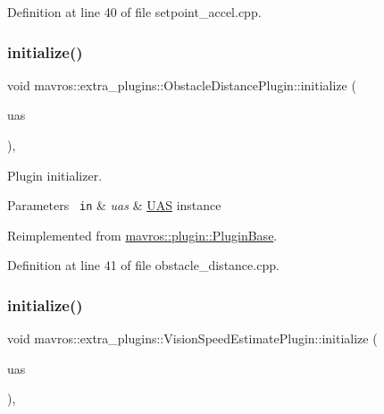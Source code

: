 Definition at line 40 of file setpoint\+\_\+accel.\+cpp.

\mbox{\label{group__plugin_gaf7844065d4ccf3cea88c251437553991}} 
\subsubsection{\texorpdfstring{initialize()}{initialize()}\hspace{0.1cm}{\footnotesize\ttfamily [19/41]}}
{\footnotesize\ttfamily void mavros\+::extra\+\_\+plugins\+::\+Obstacle\+Distance\+Plugin\+::initialize (\begin{DoxyParamCaption}\item[{\mbox{\hyperlink{classmavros_1_1UAS}{U\+AS}} \&}]{uas }\end{DoxyParamCaption})\hspace{0.3cm}{\ttfamily [inline]}, {\ttfamily [virtual]}}



Plugin initializer. 


\begin{DoxyParams}[1]{Parameters}
\mbox{\texttt{ in}}  & {\em uas} & {\ttfamily \mbox{\hyperlink{classmavros_1_1UAS}{U\+AS}}} instance \\
\hline
\end{DoxyParams}


Reimplemented from \mbox{\hyperlink{group__plugin_gad5313a41da4d26acbbabf008cdc21e82}{mavros\+::plugin\+::\+Plugin\+Base}}.



Definition at line 41 of file obstacle\+\_\+distance.\+cpp.

\mbox{\label{group__plugin_ga81a7aa98620a46b76f89020201d47198}} 
\subsubsection{\texorpdfstring{initialize()}{initialize()}\hspace{0.1cm}{\footnotesize\ttfamily [20/41]}}
{\footnotesize\ttfamily void mavros\+::extra\+\_\+plugins\+::\+Vision\+Speed\+Estimate\+Plugin\+::initialize (\begin{DoxyParamCaption}\item[{\mbox{\hyperlink{classmavros_1_1UAS}{U\+AS}} \&}]{uas }\end{DoxyParamCaption})\hspace{0.3cm}{\ttfamily [inline]}, {\ttfamily [virtual]}}



